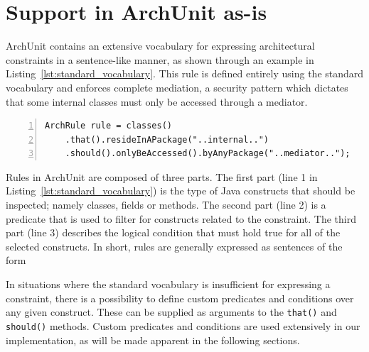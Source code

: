 \section{Support in ArchUnit as-is}\label{sec:as-is}
ArchUnit contains an extensive vocabulary for expressing architectural constraints in a sentence-like manner, as shown through an example in Listing~\ref{lst:standard_vocabulary}. This rule is defined entirely using the standard vocabulary and enforces complete mediation, a security pattern which dictates that some internal classes must only be accessed through a mediator.

\begin{minipage}{\linewidth}
\begin{lstlisting}[caption={Example of a rule that is expressed with the standard vocabulary.}, captionpos=b, label=lst:standard_vocabulary, numbers=left]
ArchRule rule = classes()
    .that().resideInAPackage("..internal..")
    .should().onlyBeAccessed().byAnyPackage("..mediator..");
\end{lstlisting}
\end{minipage}

Rules in ArchUnit are composed of three parts. The first part (line 1 in Listing~\ref{lst:standard_vocabulary}) is the type of Java constructs that should be inspected; namely classes, fields or methods. The second part (line 2) is a predicate that is used to filter for constructs related to the constraint. The third part (line 3) describes the logical condition that must hold true for all of the selected constructs. In short, rules are generally expressed as sentences of the form 


In situations where the standard vocabulary is insufficient for expressing a constraint, there is a possibility to define custom predicates and conditions over any given construct. These can be supplied as arguments to the \texttt{that()} and \texttt{should()} methods. Custom predicates and conditions are used extensively in our implementation, as will be made apparent in the following sections.

